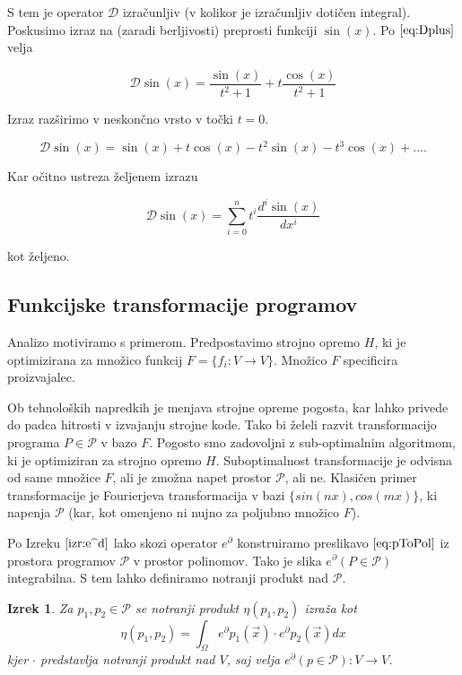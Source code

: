\documentclass{article}
\newcommand{\dP}{\mathcal{P}}
\newcommand{\D}{\partial}
\newcommand{\Dplus}{\mathcal{D}}
\newtheorem{izrek}{Izrek}[section]
\begin{document}
  S tem je operator $\Dplus$ izračunljiv (v kolikor je izračunljiv dotičen integral). Poskusimo izraz na (zaradi berljivosti) preprosti funkciji $\sin(x)$. Po $\eqref{eq:Dplus}$ velja
  
  $$\Dplus\sin(x)=\frac{\sin(x)}{t^2+1}+t\frac{\cos(x)}{t^2+1}$$
  
  Izraz razširimo v neskončno vrsto v točki $t=0$.
  
  $$\Dplus\sin(x)=\sin(x)+t\cos(x)-t^2\sin(x)-t^3\cos(x)+....$$
  
  Kar očitno ustreza željenem izrazu
  
  $$\Dplus\sin(x)=\sum\limits_{i=0}^{n}t^i\frac{d^i\sin(x)}{dx^i}$$
  
  kot željeno.
  
  \subsection{Funkcijske transformacije programov}\label{sec:FTP}
  
  Analizo motiviramo s primerom. Predpostavimo strojno opremo $H$, ki je optimizirana za množico funkcij $F=\{f_i:V\to V\}$. Množico $F$ specificira proizvajalec.
  
  Ob tehnoloških napredkih je menjava strojne opreme pogosta, kar lahko privede do padca hitrosti v izvajanju strojne kode. Tako bi želeli razvit transformacijo programa $P\in\dP$ v bazo $F$. Pogosto smo zadovoljni z sub-optimalnim algoritmom, ki je optimiziran za strojno opremo $H$. Suboptimalnost transformacije je odvisna od same množice $F$, ali je zmožna napet prostor $\dP$, ali ne. Klasičen primer transformacije je Fourierjeva transformacija v bazi $\{sin(nx), cos(mx)\}$, ki napenja $\dP$ (kar, kot omenjeno ni nujno za poljubno množico $F$).
  
  Po Izreku $\ref{izr:e^d}$ lako skozi operator $e^\D$ konstruiramo preslikavo $\eqref{eq:pToPol}$ iz prostora programov $\dP$ v prostor polinomov. Tako je slika $e^\D(P\in\dP)$ integrabilna. S tem lahko definiramo notranji produkt nad $\dP$.
  
  \begin{izrek}
  Za $p_1,p_2\in\dP$ se notranji produkt $\eta(p_1,p_2)$ izraža kot
  \begin{equation}
  	\eta(p_1,p_2)=\int_{\Omega}e^\D p_1(\vec{x})\cdot e^\D p_2(\vec{x})dx
  \end{equation}
  kjer $\cdot$ predstavlja notranji produkt nad $V$, saj velja $e^\D(p\in\dP):V\to V$.
  \end{izrek}
  
\end{document}
